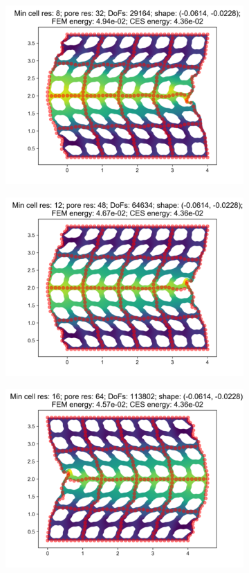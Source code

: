 \begin{figure}[H]
\begin{subfigure}{.45\textwidth}
\end{subfigure}
\begin{subfigure}{.45\textwidth}
  \centering
  \includegraphics[width=.8\linewidth]{lces/vis_compression/bm_4_mesh_3.png}
\end{subfigure}
\newline
\begin{subfigure}{.45\textwidth}
  \centering
  \includegraphics[width=.8\linewidth]{lces/vis_compression/bm_4_mesh_4.png}
\end{subfigure}
\begin{subfigure}{.45\textwidth}
  \centering
  \includegraphics[width=.8\linewidth]{lces/vis_compression/bm_4_mesh_5.png}
\end{subfigure}
\end{figure}

